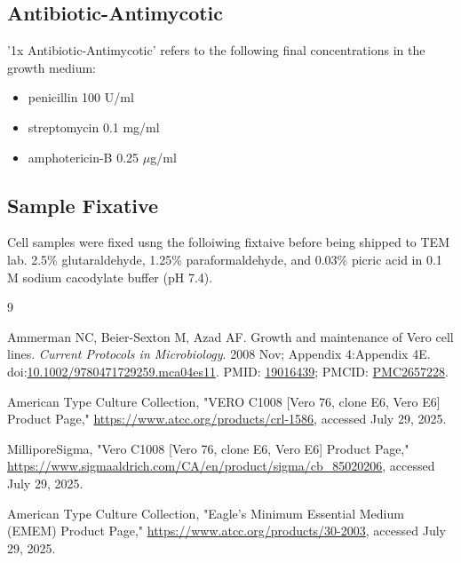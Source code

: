 \documentclass[12pt,a4paper]{article}
\begin{document}
\subsection{Antibiotic-Antimycotic}
'1x Antibiotic-Antimycotic' refers to the following final concentrations in the growth medium:
\begin{itemize}
    \item penicillin 100 U/ml
    \item streptomycin 0.1 mg/ml
    \item amphotericin-B 0.25 $\mu$g/ml %
\end{itemize}
\subsection{Sample Fixative}
Cell samples were fixed usng the folloiwing fixtaive before being shipped to TEM lab.
2.5\% glutaraldehyde, 1.25\% paraformaldehyde, and 0.03\% picric acid in 0.1 M sodium
cacodylate buffer (pH 7.4).

\begin{thebibliography}{9}

Ammerman NC, Beier-Sexton M, Azad AF. Growth and maintenance of Vero cell lines. 
\textit{Current Protocols in Microbiology}. 2008 Nov; Appendix 4:Appendix 4E.  
doi:\href{https://doi.org/10.1002/9780471729259.mca04es11}{10.1002/9780471729259.mca04es11}.  
PMID: \href{https://pubmed.ncbi.nlm.nih.gov/19016439}{19016439};  
PMCID: \href{https://www.ncbi.nlm.nih.gov/pmc/articles/PMC2657228}{PMC2657228}.

American Type Culture Collection, "VERO C1008 [Vero 76, clone E6, Vero E6] Product Page,"  
\url{https://www.atcc.org/products/crl-1586}, accessed July 29, 2025.

MilliporeSigma, "Vero C1008 [Vero 76, clone E6, Vero E6] Product Page,"  
\url{https://www.sigmaaldrich.com/CA/en/product/sigma/cb_85020206}, accessed July 29, 2025.

American Type Culture Collection, "Eagle's Minimum Essential Medium (EMEM) Product Page,"  
\url{https://www.atcc.org/products/30-2003}, accessed July 29, 2025.

\end{thebibliography}
\end{document}

